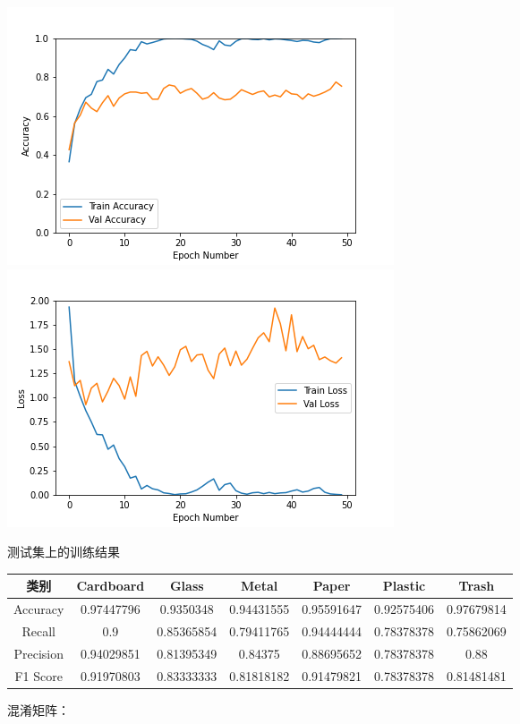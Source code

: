 \documentclass[UTF8]{ctexart}
\begin{document}
 \includegraphics[scale=0.5]{image/vgg19_bn_36_ADAM_accuracy_curve.png} 
\includegraphics[scale=0.5]{image/vgg19_bn_36_ADAM_loss_curve.png} 

测试集上的训练结果

\begin{tabular}{|c|c|c|c|c|c|c|}
\hline 
类别 & Cardboard & Glass & Metal & Paper & Plastic & Trash \\ 
\hline 
Accuracy &0.97447796& 0.9350348&  0.94431555& 0.95591647& 0.92575406& 0.97679814\\
 \hline 
Recall &0.9       & 0.85365854& 0.79411765& 0.94444444& 0.78378378& 0.75862069\\ 
\hline 
Precision &0.94029851& 0.81395349 &0.84375   & 0.88695652& 0.78378378& 0.88       \\ 
\hline 
F1 Score &0.91970803& 0.83333333 &0.81818182& 0.91479821& 0.78378378& 0.81481481 \\ 
\hline 
\end{tabular}

混淆矩阵：
\end{document}

